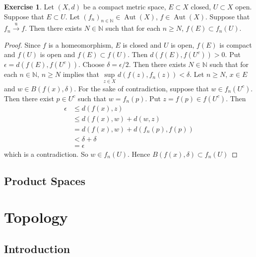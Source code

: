 \documentclass[12pt]{amsart}
\theoremstyle{definition}
\newtheorem{ex}[definition]{Exercise}
\newcommand{\del}{\delta}
\newcommand{\ep}{\epsilon}
\newcommand{\N}{\mathbb{N}}
\newcommand{\convt}[1]{\xrightarrow{\text{#1}}}
\DeclareMathOperator{\Aut}{Aut}
\newcommand{\lex}[1]{\label{ex:#1}}
\begin{document}
	\begin{ex} \lex{}
	Let $(X, d)$ be a compact metric space, $E \subset X$ closed, $U \subset X$ open. Suppose that $E \subset U$. Let $(f_n)_{n \in \N} \in \Aut(X)$, $f \in \Aut(X)$.  Suppose that $f_n \convt{u} f$. Then there exists $N \in \N$ such that for each $n \geq N$, $f(E) \subset f_n(U)$.
	\end{ex}
	
	\begin{proof}
	Since $f$ is a homeomorphism, $E$ is closed and $U$ is open, $f(E)$ is compact and $f(U)$ is open and $f(E) \subset f(U)$. Then $d(f(E), f(U^c)) >0$. Put $\ep = d(f(E), f(U^c))$. Choose $\del = \ep/2$. Then there exists $N \in \N$ such that for each $n \in \N$, $n \geq N$ implies that $\sup\limits_{z \in X} d(f(z), f_n(z)) < \del$. Let $n \geq N$, $x \in E$ and $w \in B(f(x), \del)$. For the sake of contradiction, suppose that $w \in f_n(U^c)$. Then there exist $p \in U^c$ such that $w = f_n(p)$. Put $z = f(p) \in f(U^c)$. Then 
	\begin{align*}
	\ep 
	&\leq d(f(x), z) \\ 
	&\leq d(f(x), w) + d(w, z) \\
	& = d(f(x), w) + d(f_n(p), f(p))  \\
	& < \del + \del \\
	& = \ep
	\end{align*}
	which is a contradiction. So $w \in f_n(U)$. Hence $B(f(x), \del) \subset f_n(U)$
	\end{proof}
	
	
	
	
	
	
	
	
	
	
	\newpage
	\subsection{Product Spaces}
	
	
	
	
	
	
	
	
	
	
	
	
	
	\newpage
	\section{Topology}
	
	\subsection{Introduction}
	
\end{document}
